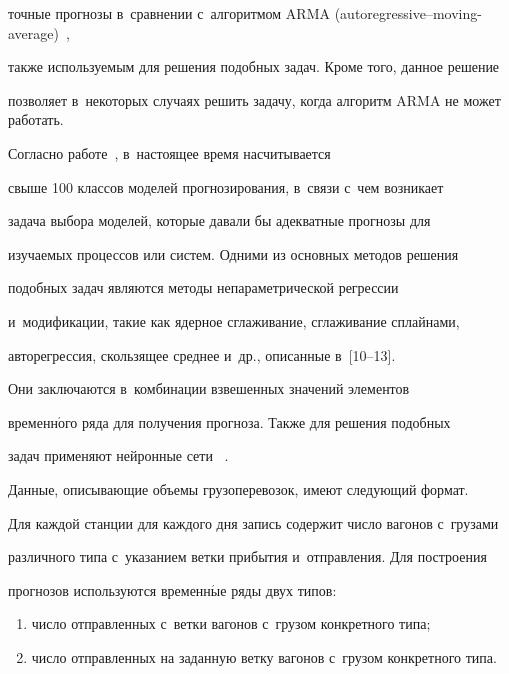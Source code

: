 точные прогнозы в~сравнении с~алгоритмом ARMA (autoregressive--moving-average)~\cite{Cortez2004ARMA,Shumway2006ARMA},


также используемым для решения подобных задач. Кроме того, данное решение


позволяет в~некоторых случаях решить задачу, когда алгоритм ARMA не может работать.





Согласно работе~\cite{Tihonov2006P}, в~настоящее время насчитывается


свыше 100 классов моделей прогнозирования, в~связи с~чем возникает


задача выбора моделей, которые давали бы адекватные прогнозы для


изучаемых процессов или систем. Одними из основных методов решения


подобных задач являются методы непараметрической регрессии


и~модификации, такие как ядерное сглаживание, сглаживание сплайнами,


авторегрессия, скользящее среднее и~др., описанные в~[10--13].


Они заключаются в~комбинации взвешенных значений элементов


временн$\acute{\mbox{о}}$го ряда для получения прогноза. Также для решения подобных


задач применяют нейронные сети ~\cite{Thiesing1997NN, Gheyas2009NN}.





Данные, описывающие объемы грузоперевозок, имеют следующий формат.


Для каждой станции для каждого дня запись содержит число вагонов с~грузами


различного типа с~указанием ветки прибытия и~отправления. Для построения


прогнозов используются временн$\acute{\mbox{ы}}$е ряды двух типов:


\begin{enumerate}[(1)]


    \item число отправленных с~ветки вагонов с~грузом конкретного типа;


    \item  число отправленных на заданную ветку вагонов с~грузом конкретного типа.


    \end{enumerate}





